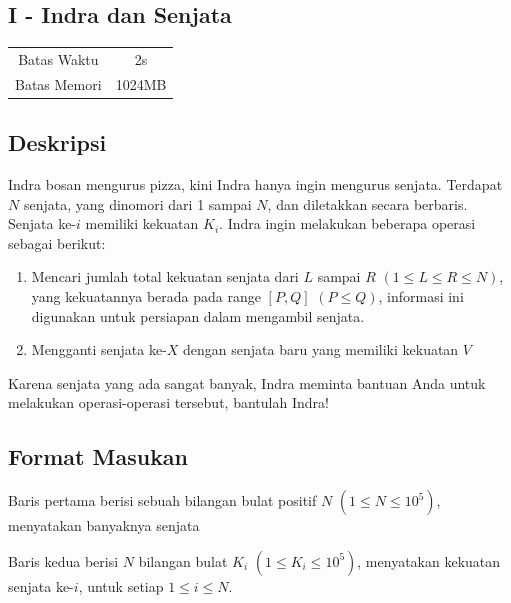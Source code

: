 \documentclass{article}
\begin{document}
\begin{center}
    \section*{I - Indra dan Senjata} %

    \begin{tabular}{ | c c | }
        \hline
        Batas Waktu  & 2s \\    %
        Batas Memori & 1024MB \\  %
        \hline
    \end{tabular}
\end{center}

\subsection*{Deskripsi}
Indra bosan mengurus pizza, kini Indra hanya ingin  mengurus senjata. Terdapat $N$ senjata, yang dinomori dari 1 sampai $N$, dan diletakkan secara berbaris. Senjata ke-$i$ memiliki kekuatan $K_i$. Indra ingin melakukan beberapa operasi sebagai berikut:

\begin{enumerate}

\item Mencari jumlah total kekuatan senjata dari $L$ sampai $R$ $(1 \leq L \leq R \leq N)$, yang kekuatannya berada pada range $\left[P, Q\right]$ $(P \leq Q)$, informasi ini digunakan untuk persiapan dalam mengambil senjata.

\item Mengganti senjata ke-$X$ dengan senjata baru yang memiliki kekuatan $V$

\end{enumerate}

Karena senjata yang ada sangat banyak, Indra meminta bantuan Anda untuk melakukan operasi-operasi tersebut, bantulah Indra!

\subsection*{Format Masukan}

Baris pertama berisi sebuah bilangan bulat positif $N$ $(1 \leq N \leq 10^5)$, menyatakan banyaknya senjata

Baris kedua berisi $N$ bilangan bulat $K_i$ $(1 \leq K_i \leq 10^5)$, menyatakan kekuatan senjata ke-$i$, untuk setiap $1 \leq i \leq N$.
\end{document}
